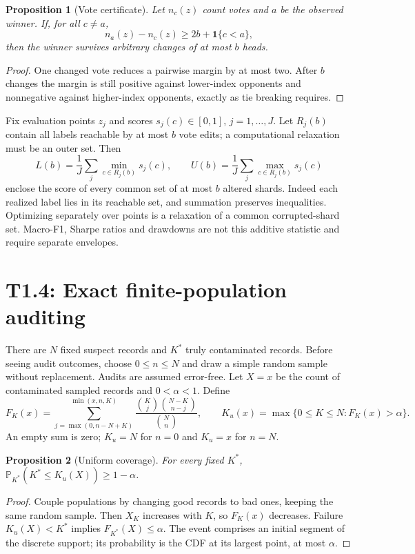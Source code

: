 \documentclass[11pt]{article}
\newtheorem{proposition}{Proposition}
\newcommand{\Prob}{\mathbb P}
\newcommand{\ind}{\mathbf 1}
\begin{document}
\begin{proposition}[Vote certificate]
Let $n_c(z)$ count votes and $a$ be the observed winner. If, for all
$c\ne a$,
\[
n_a(z)-n_c(z)\ge2b+\ind\{c<a\},
\]
then the winner survives arbitrary changes of at most $b$ heads.
\end{proposition}
\begin{proof}
One changed vote reduces a pairwise margin by at most two. After $b$
changes the margin is still positive against lower-index opponents and
nonnegative against higher-index opponents, exactly as tie breaking requires.
\end{proof}

Fix evaluation points $z_j$ and scores $s_j(c)\in[0,1]$, $j=1,\ldots,J$.
Let $R_j(b)$ contain all labels reachable by at most $b$ vote edits;
a computational relaxation must be an outer set. Then
\[
L(b)=\frac1J\sum_j\min_{c\in R_j(b)}s_j(c),\qquad
U(b)=\frac1J\sum_j\max_{c\in R_j(b)}s_j(c)
\]
enclose the score of every common set of at most $b$ altered shards.
Indeed each realized label lies in its reachable set, and summation
preserves inequalities. Optimizing separately over points is a relaxation
of a common corrupted-shard set. Macro-F1, Sharpe ratios and drawdowns are
not this additive statistic and require separate envelopes.

\section{T1.4: Exact finite-population auditing}
There are $N$ fixed suspect records and $K^*$ truly contaminated records.
Before seeing audit outcomes, choose $0\le n\le N$ and draw a simple
random sample without replacement. Audits are assumed error-free. Let
$X=x$ be the count of contaminated sampled records and $0<\alpha<1$.
Define
\[
F_K(x)=\sum_{j=\max(0,n-N+K)}^{\min(x,n,K)}
\frac{\binom Kj\binom{N-K}{n-j}}{\binom Nn},\qquad
K_u(x)=\max\{0\le K\le N:F_K(x)>\alpha\}.
\]
An empty sum is zero; $K_u=N$ for $n=0$ and $K_u=x$ for $n=N$.

\begin{proposition}[Uniform coverage]
For every fixed $K^*$, $\Prob_{K^*}(K^*\le K_u(X))\ge1-\alpha$.
\end{proposition}
\begin{proof}
Couple populations by changing good records to bad ones, keeping the
same random sample. Then $X_K$ increases with $K$, so $F_K(x)$ decreases.
Failure $K_u(X)<K^*$ implies $F_{K^*}(X)\le\alpha$.
The event comprises an initial segment of the discrete support; its
probability is the CDF at its largest point, at most $\alpha$.
\end{proof}
\end{document}
